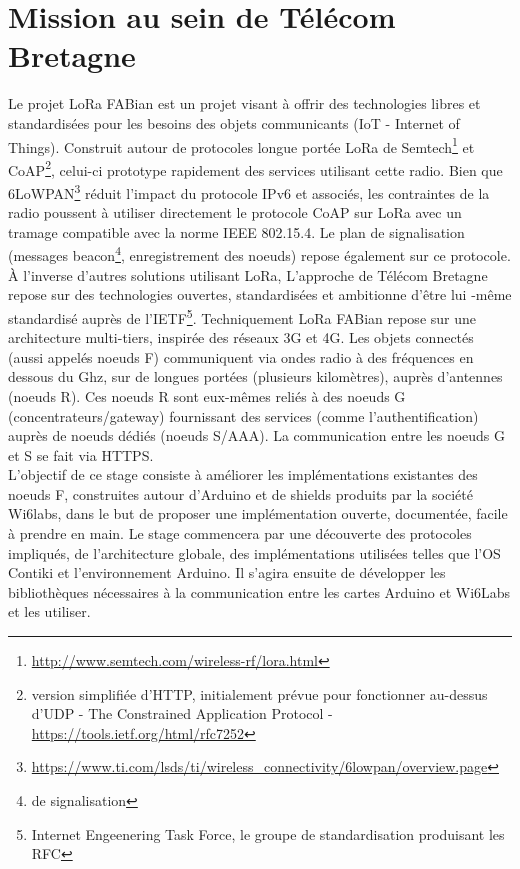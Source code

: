 \documentclass{article}
\begin{document}
\section{Mission au sein de Télécom Bretagne}
Le projet LoRa FABian est un projet visant à offrir des technologies libres et standardisées pour les besoins des objets communicants (IoT - Internet of Things). Construit autour de protocoles longue portée LoRa de Semtech\footnote{\url{http://www.semtech.com/wireless-rf/lora.html}} et CoAP\footnote{version simplifiée d'HTTP, initialement prévue pour fonctionner au-dessus d'UDP - The Constrained Application Protocol - \url{https://tools.ietf.org/html/rfc7252}}, celui-ci prototype rapidement des services utilisant cette radio. Bien que 6LoWPAN\footnote{\url{https://www.ti.com/lsds/ti/wireless_connectivity/6lowpan/overview.page}} réduit l’impact du protocole IPv6 et associés, les contraintes de la radio poussent à utiliser directement le protocole CoAP sur LoRa avec un tramage compatible avec la norme IEEE 802.15.4. Le plan de signalisation (messages beacon\footnote{de signalisation}, enregistrement des noeuds) repose également sur ce protocole. À l'inverse d’autres solutions utilisant LoRa, L’approche de Télécom Bretagne repose sur des technologies ouvertes, standardisées et ambitionne d'être lui -même standardisé auprès de l'IETF\footnote{Internet Engeenering Task Force, le groupe de standardisation produisant les RFC}. Techniquement LoRa FABian repose sur une architecture multi-tiers, inspirée des réseaux 3G et 4G. Les objets connectés (aussi appelés noeuds F) communiquent via ondes radio à des fréquences en dessous du Ghz, sur de longues portées (plusieurs kilomètres), auprès d'antennes (noeuds R). Ces noeuds R sont eux-mêmes reliés à des noeuds G (concentrateurs/gateway) fournissant des services (comme l'authentification) auprès de noeuds dédiés (noeuds S/AAA). La communication entre les noeuds G et S se fait via HTTPS.\\

L'objectif de ce stage consiste à améliorer les implémentations existantes des noeuds F, construites autour d'Arduino et de shields produits par la société Wi6labs, dans le but de proposer une implémentation ouverte, documentée, facile à prendre en main. Le stage commencera par une découverte des protocoles impliqués, de l'architecture globale, des implémentations utilisées telles que l'OS Contiki et l'environnement Arduino. Il s’agira ensuite de développer les bibliothèques nécessaires à la communication entre les cartes Arduino et Wi6Labs et les utiliser.\\
\end{document}
